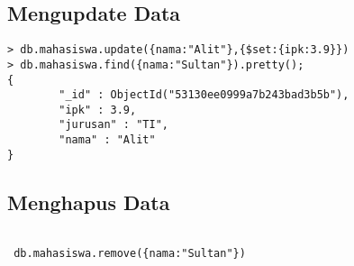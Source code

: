 \subsection {Mengupdate Data}
\begin{verbatim} 
> db.mahasiswa.update({nama:"Alit"},{$set:{ipk:3.9}})
> db.mahasiswa.find({nama:"Sultan"}).pretty();
{
        "_id" : ObjectId("53130ee0999a7b243bad3b5b"),
        "ipk" : 3.9,
        "jurusan" : "TI",
        "nama" : "Alit"
}

\end{verbatim}

\subsection {Menghapus Data}
\begin{verbatim} 

 db.mahasiswa.remove({nama:"Sultan"})
 
\end{verbatim}



